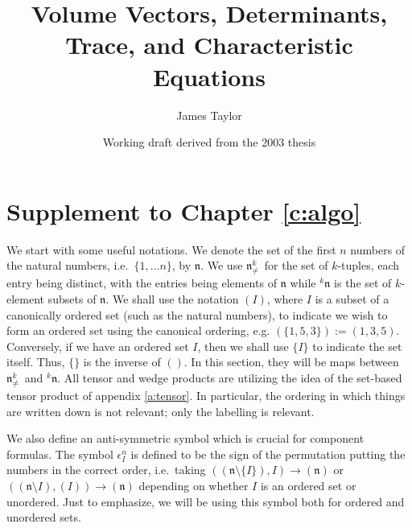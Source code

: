 \documentclass[11pt]{article}
\title{Volume Vectors, Determinants, Trace, and Characteristic Equations}
\author{James Taylor}
\date{Working draft derived from the 2003 thesis}
\theoremstyle{remark}
\begin{document}
\maketitle

\section{Supplement to Chapter \ref{c:algo}} \label{a:app7}


We start with some useful notations. 
We denote the set of the first $n$ numbers of the
natural numbers, i.e.\ $\{1, \ldots n\}$, by \ensuremath{\mathfrak{n}}.
We use \ensuremath{\ensuremath{\mathfrak{n}}^{k}_{\neq}}\ for the set of
$k$-tuples, each entry being distinct, with the entries being
elements of \ensuremath{\mathfrak{n}} while  \ensuremath{{}^{k}\!\ensuremath{\mathfrak{n}}} is the set of $k$-element subsets
of \ensuremath{\mathfrak{n}}. We shall use the notation $(I)$, where $I$ is a subset of
a canonically ordered set (such as the natural numbers), to indicate
we wish to form an ordered set using the canonical ordering,
e.g. $(\{1, 5,  3\}) \ensuremath{:=} (1,3,5)$. Conversely, if we have an ordered
set $I$, then we shall use $\{ I \}$ to indicate the set itself. Thus,
$\{ \}$ is the inverse of $( )$. In this section, they will be maps
between \ensuremath{\ensuremath{\mathfrak{n}}^{k}_{\neq}}\ and \ensuremath{{}^{k}\!\ensuremath{\mathfrak{n}}}. All tensor and wedge products
are utilizing the idea of the set-based tensor product of appendix
\ref{a:tensor}. In particular, the ordering in which things are
written down is not relevant; only the labelling is relevant. 


We also define an anti-symmetric symbol which is crucial for component
formulas. The symbol $\ensuremath{\epsilon^{n}_{I}}$ is defined to be the sign of the
permutation putting the numbers in the correct order, i.e.\ taking 
$((\ensuremath{\mathfrak{n}}\setminus \{I\}), I) \to (\ensuremath{\mathfrak{n}})$ or 
$((\ensuremath{\mathfrak{n}}\setminus I), (I)) \to (\ensuremath{\mathfrak{n}})$ depending on whether $I$
is an ordered set or unordered. Just to emphasize, we will be using
this symbol both for ordered and unordered sets.
\end{document}
